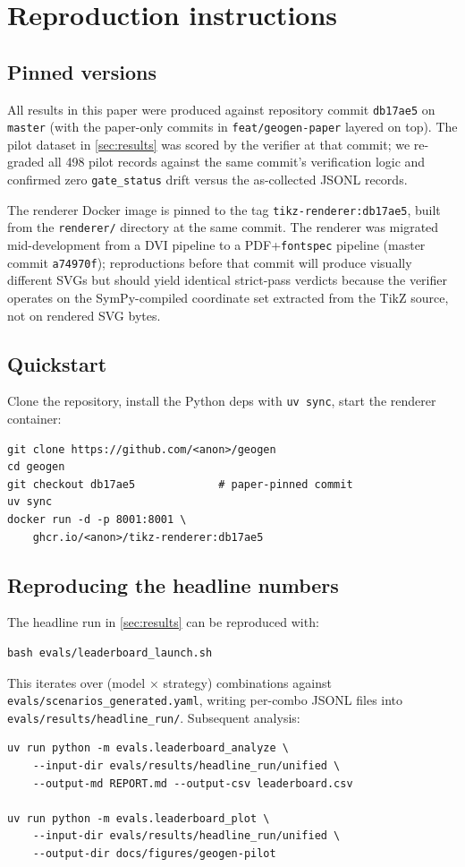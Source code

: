 \section{Reproduction instructions}
\label{app:reproduction}

\subsection{Pinned versions}
\label{app:pinned_versions}

All results in this paper were produced against repository commit \texttt{db17ae5} on \texttt{master} (with the paper-only commits in \texttt{feat/geogen-paper} layered on top). The pilot dataset in \cref{sec:results} was scored by the verifier at that commit; we re-graded all 498 pilot records against the same commit's verification logic and confirmed zero \texttt{gate\_status} drift versus the as-collected JSONL records.

The renderer Docker image is pinned to the tag \texttt{tikz-renderer:db17ae5}, built from the \texttt{renderer/} directory at the same commit. The renderer was migrated mid-development from a DVI pipeline to a PDF+\texttt{fontspec} pipeline (master commit \texttt{a74970f}); reproductions before that commit will produce visually different SVGs but should yield identical strict-pass verdicts because the verifier operates on the SymPy-compiled coordinate set extracted from the TikZ source, not on rendered SVG bytes.

\subsection{Quickstart}

Clone the repository, install the Python deps with \texttt{uv sync}, start the renderer container:
\begin{lstlisting}
git clone https://github.com/<anon>/geogen
cd geogen
git checkout db17ae5             # paper-pinned commit
uv sync
docker run -d -p 8001:8001 \
    ghcr.io/<anon>/tikz-renderer:db17ae5
\end{lstlisting}

\subsection{Reproducing the headline numbers}

The headline run in \cref{sec:results} can be reproduced with:
\begin{lstlisting}
bash evals/leaderboard_launch.sh
\end{lstlisting}
This iterates over (model $\times$ strategy) combinations against \texttt{evals/scenarios\_generated.yaml}, writing per-combo JSONL files into \texttt{evals/results/headline\_run/}.
Subsequent analysis:
\begin{lstlisting}
uv run python -m evals.leaderboard_analyze \
    --input-dir evals/results/headline_run/unified \
    --output-md REPORT.md --output-csv leaderboard.csv

uv run python -m evals.leaderboard_plot \
    --input-dir evals/results/headline_run/unified \
    --output-dir docs/figures/geogen-pilot
\end{lstlisting}

